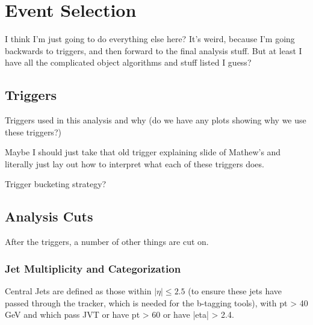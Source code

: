 \chapter{Event Selection} \label{chapter:selection}
    
    I think I'm just going to do everything else here? It's weird, because I'm going backwards to triggers,
        and then forward to the final analysis stuff. But at least I have all the complicated object algorithms and stuff listed I guess?




    \section{Triggers}

        

        Triggers used in this analysis and why (do we have any plots showing why we use these triggers?)

        Maybe I should just take that old trigger explaining slide of Mathew's
            and literally just lay out how to interpret what each of these triggers does.

        Trigger bucketing strategy?


    \section{Analysis Cuts} \label{sec:analysis_cuts}

        After the triggers, a number of other things are cut on.

    \subsection{Jet Multiplicity and Categorization}

        Central Jets are defined as those within $|\eta| \leq 2.5$
            (to ensure these jets have passed through the tracker, which is needed for the b-tagging tools\cite{vbf_hh_4b_resonant_2018_int}),
            with pt > 40 GeV and which pass JVT or have pt > 60 or have |eta| > 2.4. %
        

